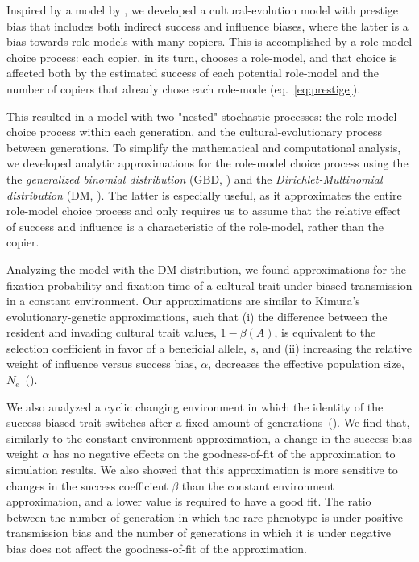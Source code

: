 \documentclass[12pt]{extarticle}
\begin{document}
Inspired by a model by \citet{evolutionBook}, we developed a cultural-evolution model with prestige bias that includes both indirect success and influence biases, where the latter is a bias towards role-models with many copiers. This is accomplished by a role-model choice process: each copier, in its turn, chooses a role-model, and that choice is affected both by the estimated success of each potential role-model and the number of copiers that already chose each role-mode (eq.~\ref{eq:prestige}). 

This resulted in a model with two "nested" stochastic processes: the role-model choice process within each generation, and the cultural-evolutionary process between generations. To simplify the mathematical and computational analysis, we developed analytic approximations for the role-model choice process using the the {\em generalized binomial distribution} (GBD, ) and the {\em Dirichlet-Multinomial distribution} (DM, ).
The latter is especially useful, as it approximates the entire role-model choice process and only requires us to assume that the relative effect of success and influence is a characteristic of the role-model, rather than the copier.

Analyzing the model with the DM distribution, we found approximations for the fixation probability and fixation time of a cultural trait under biased transmission in a constant environment.
Our approximations are similar to Kimura's evolutionary-genetic approximations, such that (i) the difference between the resident and invading cultural trait values, $1-\beta(A)$, is equivalent to the selection coefficient in favor of a beneficial allele, $s$, and (ii) increasing the relative weight of influence versus success bias, $\alpha$, decreases the effective population size, $N_e$~().

We also analyzed a cyclic changing environment in which the identity of the success-biased trait switches after a fixed amount of generations~().
We find that, similarly to the constant environment approximation, a change in the success-bias weight $\alpha$ has no negative effects on the goodness-of-fit of the approximation to simulation results.
We also showed that this approximation is more sensitive to changes in the success coefficient $\beta$ than the constant environment approximation, and a lower value is required to have a good fit. The ratio between the number of generation in which the rare phenotype is under positive transmission bias and the number of generations in which it is under negative bias does not affect the goodness-of-fit of the approximation. 
\end{document}
